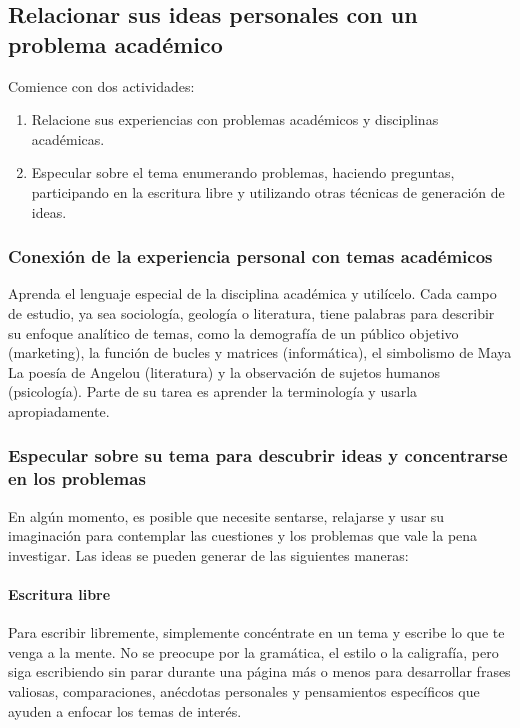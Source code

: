 \subsection{Relacionar sus ideas personales con un problema académico}
Comience con dos actividades: 
\begin{enumerate}[1.]
    \item Relacione sus experiencias con problemas académicos y disciplinas académicas. 
    \item Especular sobre el tema enumerando problemas, haciendo preguntas, participando en la escritura libre y utilizando otras técnicas de generación de ideas.
\end{enumerate}

\subsubsection{Conexión de la experiencia personal con temas académicos}
Aprenda el lenguaje especial de la disciplina académica y utilícelo. Cada campo de estudio, ya sea sociología, geología o literatura, tiene palabras para describir su enfoque analítico de temas, como la demografía de un público objetivo (marketing), la función de bucles y matrices (informática), el simbolismo de Maya La poesía de Angelou (literatura) y la observación de sujetos humanos (psicología). Parte de su tarea es aprender la terminología y usarla apropiadamente.

\subsubsection{Especular sobre su tema para descubrir ideas y concentrarse en los problemas}
En algún momento, es posible que necesite sentarse, relajarse y usar su imaginación para contemplar las cuestiones y los problemas que vale la pena investigar. Las ideas se pueden generar de las siguientes maneras:

\paragraph{Escritura libre}
Para escribir libremente, simplemente concéntrate en un tema y escribe lo que te venga a la mente. No se preocupe por la gramática, el estilo o la caligrafía, pero siga escribiendo sin parar durante una página más o menos para desarrollar frases valiosas, comparaciones, anécdotas personales y pensamientos específicos que ayuden a enfocar los temas de interés.

